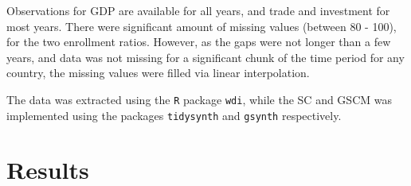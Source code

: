 \documentclass[12pt,nobind, a4paper]{reedthesis}
\begin{document}
 Observations for GDP are available for all years, and trade and investment for most years. There were significant amount of missing values (between 80 - 100), for the two enrollment ratios. However, as the gaps were not longer than a few years, and data was not missing for a significant chunk of the time period for any country, the missing values were filled via linear interpolation.
 \linebreak

 The data was extracted using the \texttt{R} package \texttt{wdi}, while the SC and GSCM was implemented using the packages \texttt{tidysynth} and \texttt{gsynth} respectively.

 \hypertarget{results}{%
 \section{Results}\label{results}}
\end{document}
